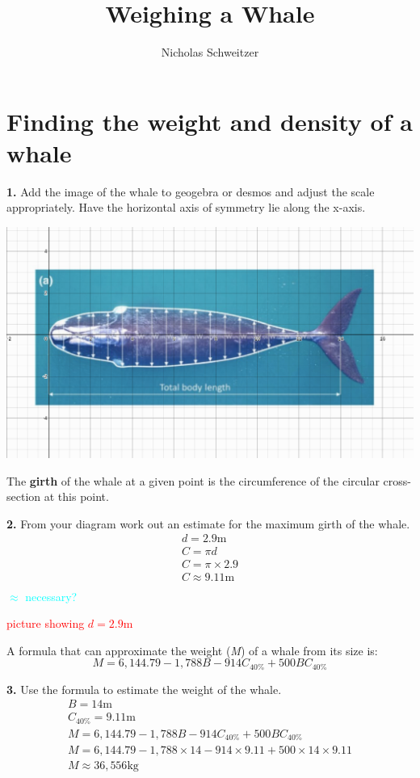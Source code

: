 \documentclass[fleqn]{article}
\title{\Huge Weighing a Whale}
\author{Nicholas Schweitzer}
\date{}
\newcommand{\unit}[1]{\ensuremath{\mathrm{#1}}}
\newcommand\todo[1]{\textcolor{red}{#1}}
\newcommand\ask[1]{\textcolor{cyan}{#1}}
\begin{document}
\maketitle

\section{Finding the weight and density of a whale}

\textbf{1.} Add the image of the whale to geogebra or desmos and adjust the scale appropriately. Have the horizontal axis of symmetry lie along the x-axis.

\includegraphics[scale=0.35]{desmos-whale.png}

The \textbf{girth} of the whale at a given point is the circumference of the circular cross-section at this point.

\textbf{2.} From your diagram work out an estimate for the maximum girth of the whale.
\begin{gather*}
  d = 2.9\unit{m} \\
  C = \pi d \\
  C = \pi \times 2.9 \\
  C \approx 9.11\unit{m} \\
\end{gather*}
\ask{$\approx$ necessary?}

\todo{picture showing $d=2.9\unit{m}$}

A formula that can approximate the weight (\textit{M}) of a whale from its size is:
\[
M = 6,144.79 - 1,788B - 914C_{40\%}+500BC_{40\%}
\]

\textbf{3.} Use the formula to estimate the weight of the whale.
\begin{gather*}
  B = 14\unit{m} \\
  C_{40\%} = 9.11\unit{m} \\
  M = 6,144.79 - 1,788B - 914C_{40\%}+500BC_{40\%} \\
  M = 6,144.79 - 1,788 \times 14 - 914 \times 9.11 + 500 \times 14 \times 9.11 \\
  M \approx 36,556 \unit{kg}
\end{gather*}
\end{document}
